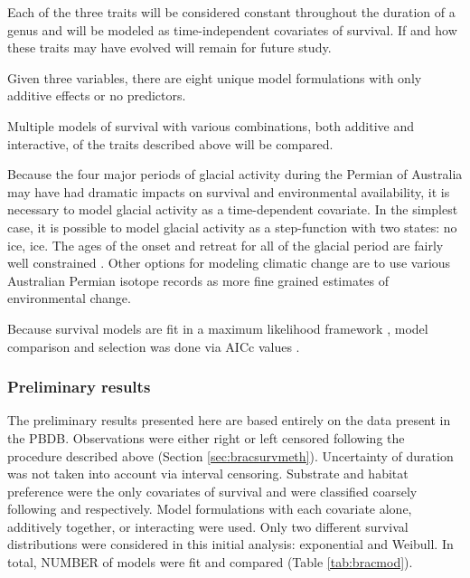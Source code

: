 \documentclass[12pt,letterpaper]{article}
\begin{document}

Each of the three traits will be considered constant throughout the duration of a genus and will be modeled as time-independent covariates of survival. If and how these traits may have evolved will remain for future study. 

Given three variables, there are eight unique model formulations with only additive effects or no predictors.

Multiple models of survival with various combinations, both additive and interactive, of the traits described above will be compared. 

Because the four major periods of glacial activity during the Permian of Australia may have had dramatic impacts on survival and environmental availability, it is necessary to model glacial activity as a time-dependent covariate. In the simplest case, it is possible to model glacial activity as a step-function with two states: no ice, ice. The ages of the onset and retreat for all of the glacial period are fairly well constrained \citep{Fielding2008,Fielding2008a}. Other options for modeling climatic change are to use various Australian Permian isotope records \citep{Birgenheier2010} as more fine grained estimates of environmental change. 

Because survival models are fit in a maximum likelihood framework \citep{Kleinbaum2005}, model comparison and selection was done via AICc values \citep{Hurvich1989,Burnham2002a}.


\subsubsection{Preliminary results} \label{sec:bracsurvres}
The preliminary results presented here are based entirely on the data present in the PBDB. Observations were either right or left censored following the procedure described above (Section \ref{sec:bracsurvmeth}). Uncertainty of duration was not taken into account via interval censoring. Substrate and habitat preference were the only covariates of survival and were classified coarsely following \citet{Foote2006} and \citet{Kiessling2007} respectively. Model formulations with each covariate alone, additively together, or interacting were used. Only two different survival distributions were considered in this initial analysis: exponential and Weibull. In total, NUMBER of models were fit and compared (Table \ref{tab:bracmod}). 
\end{document}
